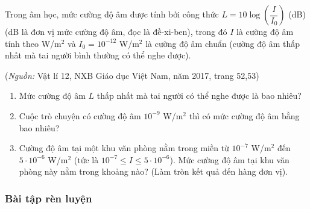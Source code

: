 \begin{vd} %
	Trong âm học, mức cường độ âm được tính bới công thức $L=10\log\left(\dfrac{I}{I_0}\right)$ (dB) (dB là đơn vị mức cường độ âm, đọc là đề-xi-ben), trong đó $I$ là cường độ âm tính theo W/m$^2$ và $I_0=10^{-12}$ W/m$^2$ là cường độ âm chuẩn (cường độ âm thấp nhất mà tai người bình thường có thể nghe được).
	\begin{center}
		(\textit{Nguồn:} Vật lí 12, NXB Giáo dục Việt Nam, năm 2017, trang 52,53)
	\end{center}
	\begin{enumerate}
		\item Mức cường độ âm $L$ thấp nhất mà tai người có thể nghe được là bao nhiêu?
		\item Cuộc trò chuyện có cường độ âm $10^{-9}$ W/m$^2$ thì có mức cường độ âm bằng bao nhiêu?
		\item Cường độ âm tại một khu văn phòng nằm trong miền từ $10^{-7}$ W/m$^2$ đến $5\cdot10^{-6}$ W/m$^2$ (tức là $10^{-7}\le I\le5\cdot10^{-6}$). Mức cường độ âm tại khu văn phòng này nằm trong khoảng nào? (Làm tròn kết quả đến hàng đơn vị).
	\end{enumerate}
\end{vd}


\subsubsection{Bài tập rèn luyện }

